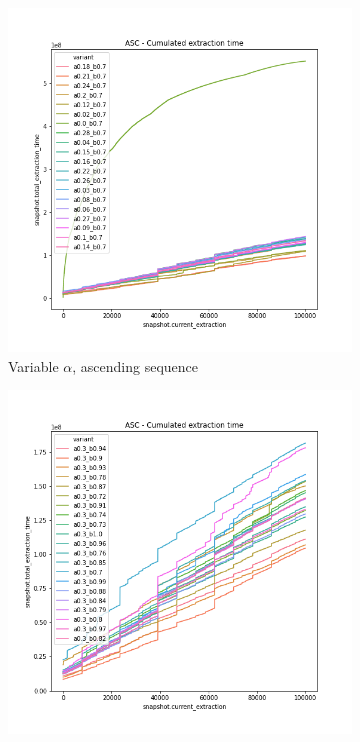 \begin{figure}
    \centering
    \begin{subfigure}[b]{0.32\textwidth}
        \centering
        \includegraphics[width=\textwidth]{./fragments/04_experimental_execution/images/04_alphabeta_detail_increasing_left.png.0_0.png}
        \caption{Variable $\alpha$, ascending sequence}
        \label{FIG:05_ALPHABETA_BENCHMARK_ASC_LEFT}
    \end{subfigure}
    \hfill
    \begin{subfigure}[b]{0.32\textwidth}
        \centering
        \includegraphics[width=\textwidth]{./fragments/04_experimental_execution/images/04_alphabeta_detail_increasing_right.png.0_0.png}

\end{subfigure}
\end{figure}
